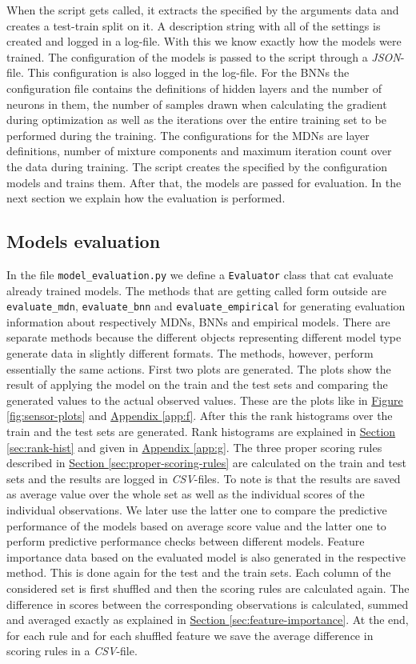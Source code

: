 \documentclass[12pt,a4paper,twoside]{scrartcl}
\numberwithin{equation}{section}
\newcommand{\reffig}[1]{\hyperref[#1]{Figure \ref*{#1}}}
\newcommand{\refsec}[1]{\hyperref[#1]{Section \ref*{#1}}}
\newcommand{\refapp}[1]{\hyperref[#1]{Appendix \ref*{#1}}}
\begin{document}
When the script gets called, it extracts the specified by the arguments data and creates a test-train split on it. A description string with all of the settings is created and logged in a log-file. With this we know exactly how the models were trained. The configuration of the models is passed to the script through a \emph{JSON}-file. This configuration is also logged in the log-file. For the BNNs the configuration file contains the definitions of hidden layers and the number of neurons in them, the number of samples drawn when calculating the gradient during optimization as well as the iterations over the entire training set to be performed during the training. The configurations for the MDNs are layer definitions, number of mixture components and maximum iteration count over the data during training. The script creates the specified by the configuration models and trains them. After that, the models are passed for evaluation. In the next section we explain how the evaluation is performed.
\subsection{Models evaluation}\label{sec:models-eval}
In the file \texttt{model\_evaluation.py} we define a \texttt{Evaluator} class that cat evaluate already trained models. The methods that are getting called form outside are \texttt{evaluate\_mdn}, \texttt{evaluate\_bnn} and \texttt{evaluate\_empirical} for generating evaluation information about respectively MDNs, BNNs and empirical models. There are separate methods because the different objects representing different model type generate data in slightly different formats. The methods, however, perform essentially the same actions. First two plots are generated. The plots show the result of applying the model on the train and the test sets and comparing the generated values to the actual observed values. These are the plots like in \reffig{fig:sensor-plots} and \refapp{app:f}. After this the rank histograms over the train and the test sets are generated. Rank histograms are explained in \refsec{sec:rank-hist} and given in \refapp{app:g}. The three proper scoring rules described in \refsec{sec:proper-scoring-rules} are calculated on the train and test sets and the results are logged in \emph{CSV}-files. To note is that the results are saved as average value over the whole set as well as the individual scores of the individual observations. We later use the latter one to compare the predictive performance of the models based on average score value and the latter one to perform predictive performance checks between different models. Feature importance data based on the evaluated model is also generated in the respective method. This is done again for the test and the train sets. Each column of the considered set is first shuffled and then the scoring rules are calculated again. The difference in scores between the corresponding observations is calculated, summed and averaged exactly as explained in \refsec{sec:feature-importance}. At the end, for each rule and for each shuffled feature we save the average difference in scoring rules in a \emph{CSV}-file.
\end{document}
